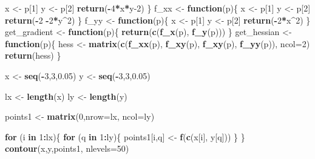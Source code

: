 \documentclass[
]{article}
\newenvironment{Shaded}{\begin{snugshade}}{\end{snugshade}}
\newcommand{\AttributeTok}[1]{\textcolor[rgb]{0.13,0.29,0.53}{#1}}
\newcommand{\ControlFlowTok}[1]{\textcolor[rgb]{0.13,0.29,0.53}{\textbf{#1}}}
\newcommand{\DecValTok}[1]{\textcolor[rgb]{0.00,0.00,0.81}{#1}}
\newcommand{\FloatTok}[1]{\textcolor[rgb]{0.00,0.00,0.81}{#1}}
\newcommand{\FunctionTok}[1]{\textcolor[rgb]{0.13,0.29,0.53}{\textbf{#1}}}
\newcommand{\NormalTok}[1]{#1}
\newcommand{\OtherTok}[1]{\textcolor[rgb]{0.56,0.35,0.01}{#1}}
\newcommand{\SpecialCharTok}[1]{\textcolor[rgb]{0.81,0.36,0.00}{\textbf{#1}}}
\begin{document}
\begin{Shaded}
\begin{Highlighting}[]
\NormalTok{  x }\OtherTok{\textless{}{-}}\NormalTok{ p[}\DecValTok{1}\NormalTok{]}
\NormalTok{  y }\OtherTok{\textless{}{-}}\NormalTok{ p[}\DecValTok{2}\NormalTok{]}
  \FunctionTok{return}\NormalTok{(}\SpecialCharTok{{-}}\DecValTok{4}\SpecialCharTok{*}\NormalTok{x}\SpecialCharTok{*}\NormalTok{y}\DecValTok{{-}2}\NormalTok{)}
\NormalTok{\}}
\NormalTok{f\_xx }\OtherTok{\textless{}{-}} \ControlFlowTok{function}\NormalTok{(p)\{}
\NormalTok{  x }\OtherTok{\textless{}{-}}\NormalTok{ p[}\DecValTok{1}\NormalTok{]}
\NormalTok{  y }\OtherTok{\textless{}{-}}\NormalTok{ p[}\DecValTok{2}\NormalTok{]}
  \FunctionTok{return}\NormalTok{(}\SpecialCharTok{{-}}\DecValTok{2} \SpecialCharTok{{-}}\DecValTok{2}\SpecialCharTok{*}\NormalTok{y}\SpecialCharTok{\^{}}\DecValTok{2}\NormalTok{)}
\NormalTok{\}}
\NormalTok{f\_yy }\OtherTok{\textless{}{-}} \ControlFlowTok{function}\NormalTok{(p)\{}
\NormalTok{  x }\OtherTok{\textless{}{-}}\NormalTok{ p[}\DecValTok{1}\NormalTok{]}
\NormalTok{  y }\OtherTok{\textless{}{-}}\NormalTok{ p[}\DecValTok{2}\NormalTok{]}
  \FunctionTok{return}\NormalTok{(}\SpecialCharTok{{-}}\DecValTok{2}\SpecialCharTok{*}\NormalTok{x}\SpecialCharTok{\^{}}\DecValTok{2}\NormalTok{)}
\NormalTok{\}}
\NormalTok{get\_gradient }\OtherTok{\textless{}{-}} \ControlFlowTok{function}\NormalTok{(p)\{}
  \FunctionTok{return}\NormalTok{(}\FunctionTok{c}\NormalTok{(}\FunctionTok{f\_x}\NormalTok{(p), }\FunctionTok{f\_y}\NormalTok{(p)))}
\NormalTok{\}}
\NormalTok{get\_hessian }\OtherTok{\textless{}{-}} \ControlFlowTok{function}\NormalTok{(p)\{}
\NormalTok{  hess }\OtherTok{\textless{}{-}} \FunctionTok{matrix}\NormalTok{(}\FunctionTok{c}\NormalTok{(}\FunctionTok{f\_xx}\NormalTok{(p), }\FunctionTok{f\_xy}\NormalTok{(p), }\FunctionTok{f\_xy}\NormalTok{(p), }\FunctionTok{f\_yy}\NormalTok{(p)), }\AttributeTok{ncol=}\DecValTok{2}\NormalTok{)}
  \FunctionTok{return}\NormalTok{(hess)}
\NormalTok{\}}

\NormalTok{x }\OtherTok{\textless{}{-}} \FunctionTok{seq}\NormalTok{(}\SpecialCharTok{{-}}\DecValTok{3}\NormalTok{,}\DecValTok{3}\NormalTok{,}\FloatTok{0.05}\NormalTok{)}
\NormalTok{y }\OtherTok{\textless{}{-}} \FunctionTok{seq}\NormalTok{(}\SpecialCharTok{{-}}\DecValTok{3}\NormalTok{,}\DecValTok{3}\NormalTok{,}\FloatTok{0.05}\NormalTok{)}

\NormalTok{lx }\OtherTok{\textless{}{-}} \FunctionTok{length}\NormalTok{(x)}
\NormalTok{ly }\OtherTok{\textless{}{-}} \FunctionTok{length}\NormalTok{(y)}

\NormalTok{points1 }\OtherTok{\textless{}{-}} \FunctionTok{matrix}\NormalTok{(}\DecValTok{0}\NormalTok{,}\AttributeTok{nrow=}\NormalTok{lx, }\AttributeTok{ncol=}\NormalTok{ly)}

\ControlFlowTok{for}\NormalTok{ (i }\ControlFlowTok{in} \DecValTok{1}\SpecialCharTok{:}\NormalTok{lx)\{}
  \ControlFlowTok{for}\NormalTok{ (q }\ControlFlowTok{in} \DecValTok{1}\SpecialCharTok{:}\NormalTok{ly)\{}
\NormalTok{    points1[i,q] }\OtherTok{\textless{}{-}} \FunctionTok{f}\NormalTok{(}\FunctionTok{c}\NormalTok{(x[i], y[q]))}
\NormalTok{  \}}
\NormalTok{\}}
\FunctionTok{contour}\NormalTok{(x,y,points1, }\AttributeTok{nlevels=}\DecValTok{50}\NormalTok{)}
\end{Highlighting}
\end{Shaded}
\end{document}
